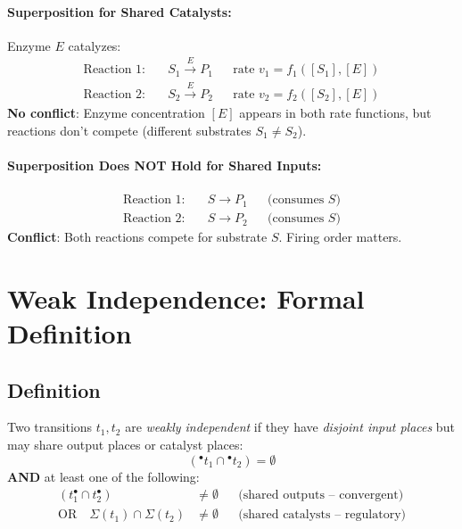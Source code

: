 \paragraph{Superposition for Shared Catalysts:}

Enzyme $E$ catalyzes:
%
\begin{align}
\text{Reaction 1:} & \quad S_1 \xrightarrow{E} P_1 && \text{rate } v_1 = f_1([S_1], [E]) \\
\text{Reaction 2:} & \quad S_2 \xrightarrow{E} P_2 && \text{rate } v_2 = f_2([S_2], [E])
\end{align}
%
\textbf{No conflict}: Enzyme concentration $[E]$ appears in both rate functions, but reactions don't compete (different substrates $S_1 \neq S_2$).

\paragraph{Superposition Does NOT Hold for Shared Inputs:}
%
\begin{align}
\text{Reaction 1:} & \quad S \to P_1 && \text{(consumes $S$)} \\
\text{Reaction 2:} & \quad S \to P_2 && \text{(consumes $S$)}
\end{align}
%
\textbf{Conflict}: Both reactions compete for substrate $S$. Firing order matters.

\section{Weak Independence: Formal Definition}
\label{sec:weak-independence-definition}

\subsection{Definition}
\label{subsec:weak-independence-def}

Two transitions $t_1, t_2$ are \emph{weakly independent} if they have \emph{disjoint input places} but may share output places or catalyst places:
%
\begin{equation}
({}^\bullet t_1 \cap {}^\bullet t_2) = \emptyset
\label{eq:weak-independence-condition}
\end{equation}
%
\textbf{AND} at least one of the following:
%
\begin{align}
(t_1^\bullet \cap t_2^\bullet) &\neq \emptyset && \text{(shared outputs -- convergent)} \label{eq:convergent} \\
\text{OR} \quad \Sigma(t_1) \cap \Sigma(t_2) &\neq \emptyset && \text{(shared catalysts -- regulatory)} \label{eq:regulatory}
\end{align}

